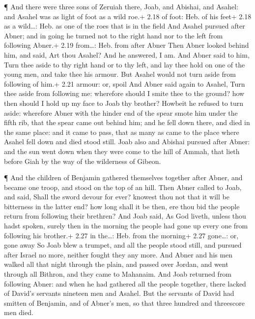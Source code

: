  ¶ And there were three sons of Zeruiah there, Joab, and
Abishai, and Asahel: and Asahel was as light of foot as a wild roe.+
2.18 of foot: Heb. of his feet+ 2.18 as a wild\ldots: Heb. as one of the
roes that is in the field  And Asahel pursued after Abner;
and in going he turned not to the right hand nor to the left from
following Abner.+ 2.19 from\ldots: Heb. from after Abner 
Then Abner looked behind him, and said, Art thou Asahel? And he
answered, I am.  And Abner said to him, Turn thee aside to
thy right hand or to thy left, and lay thee hold on one of the young
men, and take thee his armour. But Asahel would not turn aside from
following of him.+ 2.21 armour: or, spoil  And Abner said
again to Asahel, Turn thee aside from following me: wherefore should I
smite thee to the ground? how then should I hold up my face to Joab thy
brother?  Howbeit he refused to turn aside: wherefore Abner
with the hinder end of the spear smote him under the fifth rib, that the
spear came out behind him; and he fell down there, and died in the same
place: and it came to pass, that as many as came to the place where
Asahel fell down and died stood still.  Joab also and
Abishai pursued after Abner: and the sun went down when they were come
to the hill of Ammah, that lieth before Giah by the way of the
wilderness of Gibeon.

 ¶ And the children of Benjamin gathered themselves
together after Abner, and became one troop, and stood on the top of an
hill.  Then Abner called to Joab, and said, Shall the sword
devour for ever? knowest thou not that it will be bitterness in the
latter end? how long shall it be then, ere thou bid the people return
from following their brethren?  And Joab said, As God
liveth, unless thou hadst spoken, surely then in the morning the people
had gone up every one from following his brother.+ 2.27 in the\ldots:
Heb. from the morning+ 2.27 gone\ldots: or, gone away  So
Joab blew a trumpet, and all the people stood still, and pursued after
Israel no more, neither fought they any more.  And Abner
and his men walked all that night through the plain, and passed over
Jordan, and went through all Bithron, and they came to Mahanaim.
 And Joab returned from following Abner: and when he had
gathered all the people together, there lacked of David's servants
nineteen men and Asahel.  But the servants of David had
smitten of Benjamin, and of Abner's men, so that three hundred and
threescore men died.

